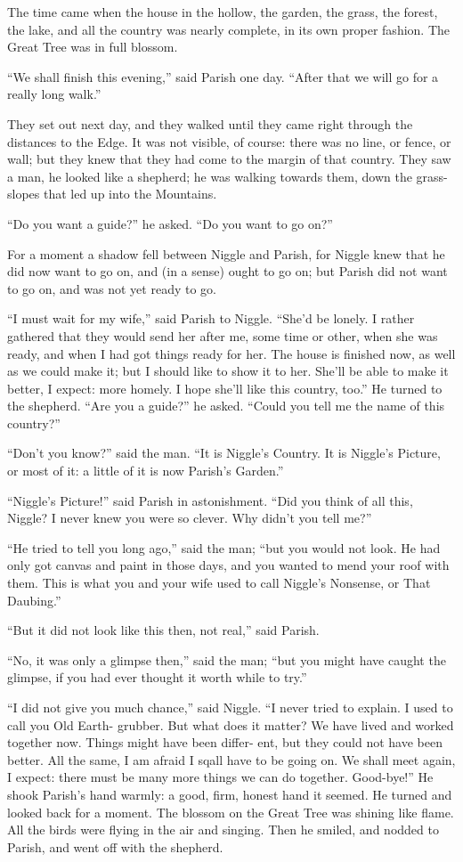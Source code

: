 \documentclass[english]{scrartcl}
\begin{document}
The time came when the house in the hollow, the garden, the grass, the forest, the lake, and all the country was nearly complete, in its own proper fashion. The Great Tree was in full blossom.

“We shall finish this evening,” said Parish one day. “After that we will go for a really long walk.”

They set out next day, and they walked until they came right through the distances to the Edge. It was not visible, of course: there was no line, or fence, or wall; but they knew that they had come to the margin of that country. They saw a man, he looked like a shepherd; he was walking towards them, down the grass-slopes that led up into the Mountains.

“Do you want a guide?” he asked. “Do you want to go on?”

For a moment a shadow fell between Niggle and Parish, for Niggle knew that he did now want to go on, and (in a sense) ought to go on; but Parish did not want to go on, and was not yet ready to go.

“I must wait for my wife,” said Parish to Niggle. “She’d be lonely. I rather gathered that they would send her after me, some time or other, when she was ready, and when I had got things ready for her. The house is finished now, as well as we could make it; but I should like to show it to her. She’ll be able to make it better, I expect: more homely. I hope she’ll like this country, too.” He turned to the shepherd. “Are you a guide?” he asked. “Could you tell me the name of this country?”

“Don’t you know?” said the man. “It is Niggle’s Country. It is Niggle’s Picture, or most of it: a little of it is now Parish’s Garden.”

“Niggle’s Picture!” said Parish in astonishment. “Did you think of all this, Niggle? I never knew you were so clever. Why didn’t you tell me?”

“He tried to tell you long ago,” said the man; “but you would not look. He had only got canvas and paint in those days, and you wanted to mend your roof with them. This is what you and your wife used to call Niggle’s Nonsense, or That Daubing.”

“But it did not look like this then, not real,” said Parish.

“No, it was only a glimpse then,” said the man; “but you might have caught the glimpse, if you had ever thought it worth while to try.”

“I did not give you much chance,” said Niggle. “I never tried to explain. I used to call you Old Earth- grubber. But what does it matter? We have lived and worked together now. Things might have been differ- ent, but they could not have been better. All the same, I am afraid I sqall have to be going on. We shall meet again, I expect: there must be many more things we can do together. Good-bye!” He shook Parish’s hand warmly: a good, firm, honest hand it seemed. He turned and looked back for a moment. The blossom on the Great Tree was shining like flame. All the birds were flying in the air and singing. Then he smiled, and nodded to Parish, and went off with the shepherd.
\end{document}
